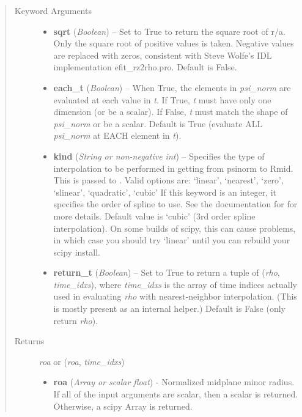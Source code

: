 \documentclass[letterpaper,10pt,english]{sphinxmanual}
\begin{document}
\begin{fulllineitems}
\begin{fulllineitems}
\begin{quote}
\begin{description}
\begin{itemize}
\end{itemize}

\item[{Keyword Arguments}] \leavevmode\begin{itemize}
\item {} 
\textbf{sqrt} (\emph{Boolean}) --
Set to True to return the square root of r/a. Only
the square root of positive values is taken. Negative values are
replaced with zeros, consistent with Steve Wolfe's IDL
implementation efit\_rz2rho.pro. Default is False.

\item {} 
\textbf{each\_t} (\emph{Boolean}) --
When True, the elements in \emph{psi\_norm} are evaluated at
each value in \emph{t}. If True, \emph{t} must have only one dimension (or
be a scalar). If False, \emph{t} must match the shape of \emph{psi\_norm} or be
a scalar. Default is True (evaluate ALL \emph{psi\_norm} at EACH element in
\emph{t}).

\item {} 
\textbf{kind} (\emph{String or non-negative int}) --
Specifies the type of
interpolation to be performed in getting from psinorm to
Rmid. This is passed to
. Valid options are:
`linear', `nearest', `zero', `slinear', `quadratic', `cubic'
If this keyword is an integer, it specifies the order of spline
to use. See the documentation for  for more
details. Default value is `cubic' (3rd order spline
interpolation). On some builds of scipy, this can cause problems,
in which case you should try `linear' until you can rebuild your
scipy install.

\item {} 
\textbf{return\_t} (\emph{Boolean}) --
Set to True to return a tuple of (\emph{rho},
\emph{time\_idxs}), where \emph{time\_idxs} is the array of time indices
actually used in evaluating \emph{rho} with nearest-neighbor
interpolation. (This is mostly present as an internal helper.)
Default is False (only return \emph{rho}).

\end{itemize}

\item[{Returns}] \leavevmode

\emph{roa} or (\emph{roa}, \emph{time\_idxs})
\begin{itemize}
\item {} 
\textbf{roa} (\emph{Array or scalar float}) - Normalized midplane minor
radius. If all of the input arguments are scalar, then a scalar
is returned. Otherwise, a scipy Array is returned.


\end{itemize}
\end{description}
\end{quote}
\end{fulllineitems}
\end{fulllineitems}
\end{document}
